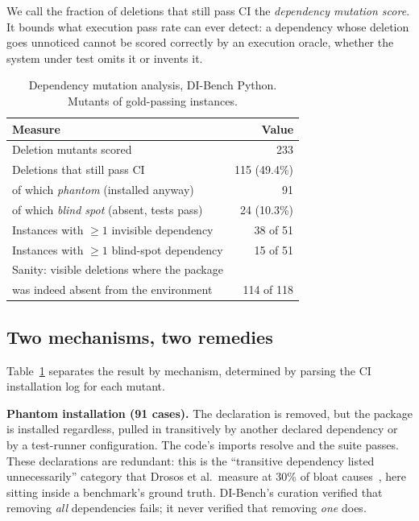 \documentclass[10pt,conference]{IEEEtran}
\newcommand{\dibench}{DI-Bench}
\begin{document}
We call the fraction of deletions that still pass CI the
\emph{dependency mutation score}. It bounds what execution pass rate can
ever detect: a dependency whose deletion goes unnoticed cannot be scored
correctly by an execution oracle, whether the system under test omits it
or invents it.

\begin{table}[t]
\caption{Dependency mutation analysis, \dibench{} Python. Mutants of
gold-passing instances.}
\label{tab:mutation}
\centering
\begin{tabular}{lr}
\toprule
\textbf{Measure} & \textbf{Value} \\
\midrule
Deletion mutants scored                       & 233 \\
Deletions that still pass CI                  & 115 (49.4\%) \\
\quad of which \emph{phantom} (installed anyway) & 91 \\
\quad of which \emph{blind spot} (absent, tests pass) & 24 (10.3\%) \\
Instances with $\geq 1$ invisible dependency  & 38 of 51 \\
Instances with $\geq 1$ blind-spot dependency & 15 of 51 \\
\midrule
Sanity: visible deletions where the package & \\
\quad was indeed absent from the environment  & 114 of 118 \\
\bottomrule
\end{tabular}
\end{table}

\subsection{Two mechanisms, two remedies}

Table~\ref{tab:mutation} separates the result by mechanism, determined by
parsing the CI installation log for each mutant.

\textbf{Phantom installation (91 cases).} The declaration is removed, but
the package is installed regardless, pulled in transitively by another
declared dependency or by a test-runner configuration. The code's imports
resolve and the suite passes. These declarations are redundant: this is
the ``transitive dependency listed unnecessarily'' category that Drosos
et al.\ measure at 30\% of bloat causes~\cite{drosos2024bloat}, here
sitting inside a benchmark's ground truth. \dibench's curation verified
that removing \emph{all} dependencies fails; it never verified that
removing \emph{one} does.
\end{document}
